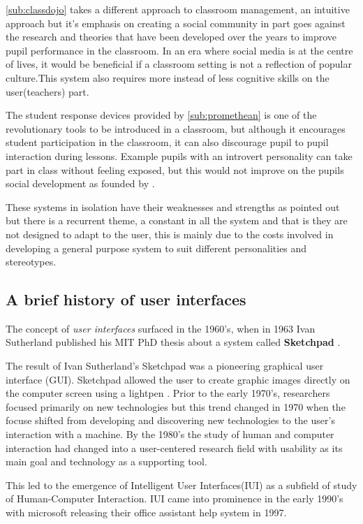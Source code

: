 \ref{sub:classdojo} takes a different approach to classroom management, an intuitive approach but it's emphasis on creating a social community in part goes against the research and theories that have been developed over the years to improve pupil performance in the classroom. In an era where social media is at the centre of lives, it would be beneficial if a classroom setting is not a reflection of popular culture.This system also requires more instead of less cognitive skills on the user(teachers) part.

The student response devices provided by \ref{sub:promethean} is one of the revolutionary tools to be introduced in a classroom, but although it encourages student participation in the classroom, it can also discourage pupil to pupil interaction during lessons. Example pupils with an introvert personality can take part in class without feeling exposed, but this would not improve on the pupils social development as founded by \cite{alexander1992curriculum}.

These systems in isolation have their weaknesses and strengths as pointed out but there is a recurrent theme, a constant in all the system and that is they are not designed to adapt to the user, this is mainly due to the costs involved in developing a general purpose system to suit different personalities and stereotypes.

\subsection{A brief history of user interfaces} \label{sub:history}
The concept of \emph{user interfaces} surfaced in the 1960's, when in 1963 Ivan Sutherland published his MIT PhD thesis about a system called \textbf{Sketchpad} \cite{sutherland1964sketch}.

The result of Ivan Sutherland's Sketchpad was a pioneering graphical user interface (GUI). Sketchpad allowed the user to create graphic images directly on the computer screen using a lightpen \cite{patrick2003intelligent}.
Prior to the early 1970's, researchers focused primarily on new technologies but this trend changed in 1970 when the focuse shifted from developing and discovering new technologies to the user's interaction with a machine.
By the 1980's the study of human and computer interaction had changed into a user-centered research field with usability as its main goal and technology as a supporting tool.\cite{patrick2003intelligent}

This led to the emergence of Intelligent User Interfaces(IUI) as a subfield of study of Human-Computer Interaction. IUI came into prominence in the early 1990's with microsoft releasing their office assistant help system in 1997.

